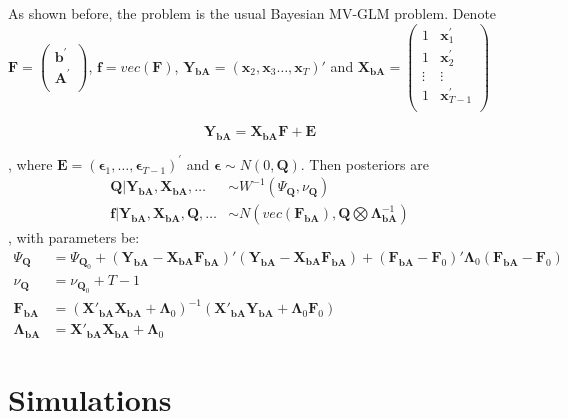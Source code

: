\documentclass[]{article}
\begin{document}
As shown before, the problem is the usual Bayesian MV-GLM problem. Denote \(\mathbf{F} = \begin{pmatrix}
	\mathbf{b}^{'} \\
	\mathbf{A}^{'} \\
\end{pmatrix}\), \(\mathbf{f} = vec(\mathbf{F})\), \(\mathbf{Y}_\mathbf{bA} = (\mathbf{x}_{2}, \mathbf{x}_{3} \ldots, \mathbf{x}_{T})'\) and \(\mathbf{X}_\mathbf{bA} = \begin{pmatrix}
1 & \mathbf{x}_{1}^{'} \\
1 & \mathbf{x}_{2}^{'} \\
\vdots & \vdots \\
1 & \mathbf{x}_{T - 1}^{'} \\
\end{pmatrix}\)

\[\mathbf{Y}_\mathbf{bA} = \mathbf{X}_\mathbf{bA}\mathbf{F}+ \mathbf{E}\]

, where
\(\mathbf{E} = \left( \mathbf{\epsilon}_{1},\ldots,\mathbf{\epsilon}_{T - 1} \right)^{'}\) and \(\mathbf{\epsilon} \sim N(0,\mathbf{Q})\). Then posteriors are
\begin{align*}
	\mathbf{Q}|\mathbf{Y}_{\mathbf{bA}},\mathbf{X}_{\mathbf{bA}},\ldots &\sim W^{-1}(\Psi_{\mathbf{Q}}, \nu_{\mathbf{Q}})\\
	\mathbf{f}|\mathbf{Y}_{\mathbf{bA}},\mathbf{X}_{\mathbf{bA}},\mathbf{Q},\ldots &\sim N(vec(\mathbf{F}_\mathbf{bA}),  \mathbf{Q}\bigotimes \bm{\Lambda}_\mathbf{bA}^{-1})
\end{align*}
, with parameters be:
\begin{align*}
	\Psi_{\mathbf{Q}} &= \Psi_{\mathbf{Q}_{0}} + (\mathbf{Y}_\mathbf{bA} - \mathbf{X}_\mathbf{bA}\mathbf{F}_\mathbf{bA})'(\mathbf{Y}_\mathbf{bA} - \mathbf{X}_\mathbf{bA}\mathbf{F}_\mathbf{bA}) + (\mathbf{F}_\mathbf{bA} - \mathbf{F}_0)'\bm{\Lambda}_0(\mathbf{F}_\mathbf{bA} - \mathbf{F}_0)\\
	\nu_{\mathbf{Q}} &= \nu_{\mathbf{Q}_{0}} + T - 1\\
	\mathbf{F}_\mathbf{bA} &= (\mathbf{X}'_\mathbf{bA}\mathbf{X}_\mathbf{bA} + \bm{\Lambda}_0)^{-1}(\mathbf{X}'_\mathbf{bA}\mathbf{Y}_\mathbf{bA} + \bm{\Lambda}_0\mathbf{F}_0)\\
	\bm{\Lambda}_\mathbf{bA} &= \mathbf{X}'_\mathbf{bA}\mathbf{X}_\mathbf{bA} + \bm{\Lambda}_0
\end{align*}




\section{Simulations}\label{sim}
\end{document}
